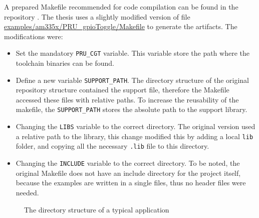 A prepared Makefile recommended for \pru{} code compilation can be found in the repository \citep{TI_PRUSS_REPO}. The thesis uses a slightly modified version of file \url{examples/am335x/PRU_gpioToggle/Makefile} to generate the artifacts. The modifications were:
\begin{itemize}
	\item Set the mandatory \verb+PRU_CGT+ variable. This variable store the path where the toolchain binaries can be found.
	\item Define a new variable \verb+SUPPORT_PATH+. The directory structure of the original repository structure contained the support file, therefore the Makefile accessed these files with relative paths. To increase the reusability of the makefile, the \verb+SUPPORT_PATH+ stores the absolute path to the support library.
	\item Changing the \verb+LIBS+ variable to the correct directory. The original version used a relative path to the library, this change modified this by adding a local \verb+lib+ folder, and copying all the necessary \verb+.lib+ file to this directory.
	\item Changing the \verb+INCLUDE+ variable to the correct directory. To be noted, the original Makefile does not have an include directory for the project itself, because the examples are written in a single files, thus no header files were needed.
\end{itemize}

\begin{figure}[!h]
	\centering
	\caption{The directory structure of a typical \pru{} application}
\label{fig:pru_dir_structure}
\end{figure}

